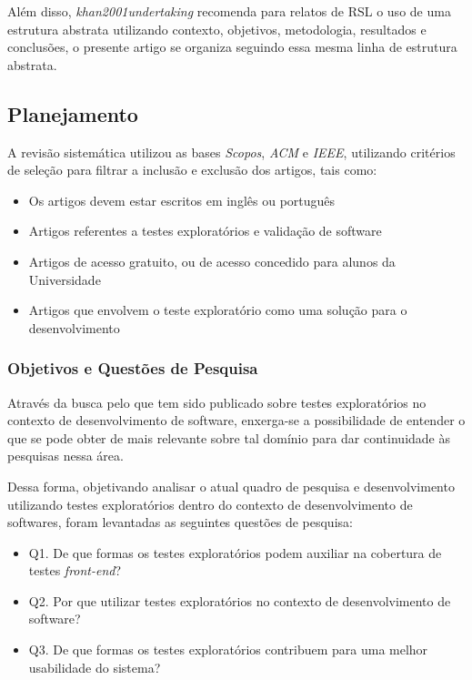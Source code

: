 \par Além disso, \textit{khan2001undertaking} recomenda para relatos de RSL o uso de uma estrutura abstrata utilizando contexto, objetivos, metodologia, resultados e conclusões, o presente artigo se organiza seguindo essa mesma linha de estrutura abstrata.

\subsection{Planejamento}
\par A revisão sistemática utilizou as bases \textit{Scopos}, \textit{ACM} e \textit{IEEE}, utilizando critérios de seleção para filtrar a inclusão e exclusão dos artigos, tais como:

\begin{itemize}
    \item Os artigos devem estar escritos em inglês ou português
    \item Artigos referentes a testes exploratórios e validação de software
    \item Artigos de acesso gratuito, ou de acesso concedido para alunos da Universidade
    \item Artigos que envolvem o teste exploratório como uma solução para o desenvolvimento
\end{itemize}

\subsubsection{Objetivos e Questões de Pesquisa}

\par Através da busca pelo que tem sido publicado sobre testes exploratórios no contexto de desenvolvimento de software, enxerga-se a possibilidade de entender o que se pode obter de mais relevante sobre tal domínio para dar continuidade às pesquisas nessa área.

\par Dessa forma, objetivando analisar o atual quadro de pesquisa e desenvolvimento utilizando testes exploratórios dentro do contexto de desenvolvimento de softwares, foram levantadas as seguintes questões de pesquisa: 

\begin{itemize}
    \item Q1. De que formas os testes exploratórios podem auxiliar na cobertura de testes \textit{front-end}?
    \item Q2. Por que utilizar testes exploratórios no contexto de desenvolvimento de software?
    \item Q3. De que formas os testes exploratórios contribuem para uma melhor usabilidade do sistema?
\end{itemize}

